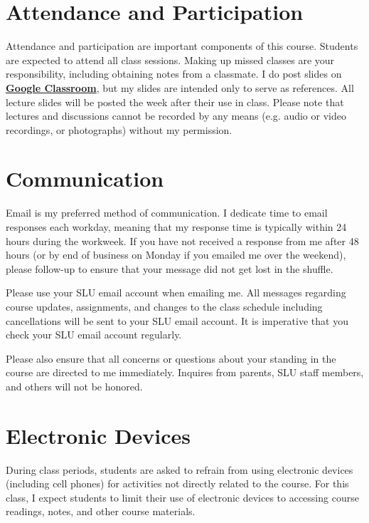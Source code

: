 \documentclass{tufte-book}
\begin{document}
\vspace{3mm}
\section{Attendance and Participation}
Attendance and participation are important components of this course. Students are expected to attend all class sessions. Making up missed classes are your responsibility, including obtaining notes from a classmate. I do post slides on \textbf{\href{https://classroom.google.com}{Google Classroom}}, but my slides are intended only to serve as references. All lecture slides will be posted the week after their use in class. Please note that lectures and discussions cannot be recorded by any means (e.g. audio or video recordings, or photographs) without my permission.

\vspace{3mm}
\section{Communication}
Email is my preferred method of communication. I dedicate time to email responses each workday, meaning that my response time is typically within 24 hours during the workweek. If you have not received a response from me after 48 hours (or by end of business on Monday if you emailed me over the weekend), please follow-up to ensure that your message did not get lost in the shuffle. 

\par Please use your SLU email account when emailing me. All messages regarding course updates, assignments, and changes to the class schedule including cancellations will be sent to your SLU email account. It is imperative that you check your SLU email account regularly. 

\par Please also ensure that all concerns or questions about your standing in the course are directed to me immediately. Inquires from parents, SLU staff members, and others will not be honored.

\vspace{3mm}
\section{Electronic Devices}
During class periods, students are asked to refrain from using electronic devices (including cell phones) for activities not directly related to the course. For this class, I expect students to limit their use of electronic devices to accessing course readings, notes, and other course materials.
\end{document}
